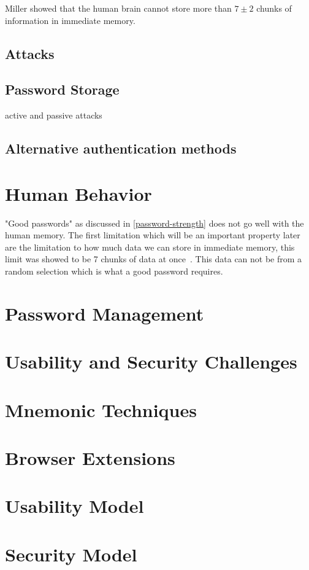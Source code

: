 Miller \cite{magic-seven_miller} showed that the human brain cannot store more than $7\pm 2$ chunks of information in immediate memory.
\subsection{Attacks}
\subsection{Password Storage}
active and passive attacks  
\subsection{Alternative authentication methods}

\section{Human Behavior}
"Good passwords" as discussed in \ref{password-strength} does not go well with the human memory. The first limitation which will be an important property later are the limitation to how much data we can store in immediate memory, this limit was showed to be 7 chunks of data at once~\cite{magic-seven_miller}. This data can not be from a random selection which is what a good password requires.   

\section{Password Management}

\section{Usability and Security Challenges}

\section{Mnemonic Techniques}

\section{Browser Extensions}

\section{Usability Model}

\section{Security Model}




